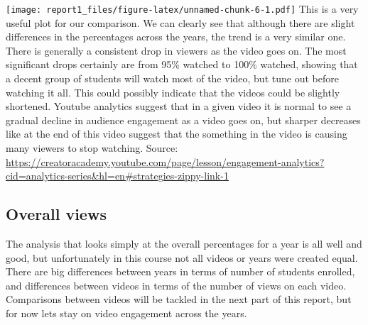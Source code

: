 \documentclass[
]{article}
\newenvironment{Shaded}{\begin{snugshade}}{\end{snugshade}}
\newcommand{\DataTypeTok}[1]{\textcolor[rgb]{0.13,0.29,0.53}{#1}}
\newcommand{\KeywordTok}[1]{\textcolor[rgb]{0.13,0.29,0.53}{\textbf{#1}}}
\newcommand{\NormalTok}[1]{#1}
\newcommand{\OperatorTok}[1]{\textcolor[rgb]{0.81,0.36,0.00}{\textbf{#1}}}
\newcommand{\StringTok}[1]{\textcolor[rgb]{0.31,0.60,0.02}{#1}}
\begin{document}
\begin{Shaded}
\end{Shaded}

\texttt{[image: report1\_files/figure-latex/unnamed-chunk-6-1.pdf]} This
is a very useful plot for our comparison. We can clearly see that
although there are slight differences in the percentages across the
years, the trend is a very similar one. There is generally a consistent
drop in viewers as the video goes on. The most significant drops
certainly are from 95\% watched to 100\% watched, showing that a decent
group of students will watch most of the video, but tune out before
watching it all. This could possibly indicate that the videos could be
slightly shortened. Youtube analytics suggest that in a given video it
is normal to see a gradual decline in audience engagement as a video
goes on, but sharper decreases like at the end of this video suggest
that the something in the video is causing many viewers to stop
watching. Source:
\url{https://creatoracademy.youtube.com/page/lesson/engagement-analytics?cid=analytics-series\&hl=en\#strategies-zippy-link-1}

\hypertarget{overall-views}{%
\subsection{Overall views}\label{overall-views}}

The analysis that looks simply at the overall percentages for a year is
all well and good, but unfortunately in this course not all videos or
years were created equal. There are big differences between years in
terms of number of students enrolled, and differences between videos in
terms of the number of views on each video. Comparisons between videos
will be tackled in the next part of this report, but for now lets stay
on video engagement across the years.
\end{document}
